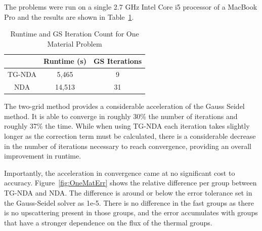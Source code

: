 The problems were run on a single 2.7 GHz Intel Core i5 processor of a MacBook Pro and the results are shown in Table~\ref{tab:onemat}.
\begin{table}[!htb]
\centering
\caption{Runtime and GS Iteration Count for One Material Problem}
    \label{tab:onemat}
\begin{center}
    \begin{tabular}{|c|c|c|}
    \hline
    & Runtime (s) & GS Iterations \\
    \hline

    TG-NDA & 5,465 & 9 \\
    NDA & 14,513 & 31 \\
    \hline
    \end{tabular}
\end{center}
\end{table}

The two-grid method provides a considerable acceleration of the Gauss Seidel method. It is able to converge in roughly 30\% the number of iterations and roughly 37\% the time. While when using TG-NDA each iteration takes slightly longer as the correction term must be calculated, there is a considerable decrease in the number of iterations necessary to reach convergence, providing an overall improvement in runtime. 

Importantly, the acceleration in convergence came at no significant cost to accuracy. Figure~\ref{fig:OneMatErr} shows the relative difference per group between TG-NDA and NDA. The difference is around or below the error tolerance set in the Gauss-Seidel solver as 1e-5. There is no difference in the fast groups as there is no upscattering present in those groups, and the error accumulates with groups that have a stronger dependence on the flux of the thermal groups. 

